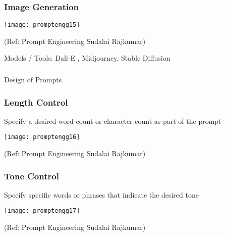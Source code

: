\begin{frame}[fragile]\frametitle{Image Generation}

\begin{center}
\texttt{[image: promptengg15]}

{\tiny (Ref: Prompt Engineering Sudalai Rajkumar)}

\end{center}		
		
		
Models / Tools: Dall-E , Midjourney, Stable Diffusion



\end{frame}


\begin{frame}[fragile]\frametitle{}
\begin{center}
{\Large Design of Prompts}
\end{center}
\end{frame}

\begin{frame}[fragile]\frametitle{Length Control}

Specify a desired word count or character count as part of the prompt

\begin{center}
\texttt{[image: promptengg16]}

{\tiny (Ref: Prompt Engineering Sudalai Rajkumar)}

\end{center}		
		
		


\end{frame}

\begin{frame}[fragile]\frametitle{Tone Control}

Specify specific words or phrases that indicate the desired tone

\begin{center}
\texttt{[image: promptengg17]}

{\tiny (Ref: Prompt Engineering Sudalai Rajkumar)}

\end{center}		
		
		


\end{frame}

